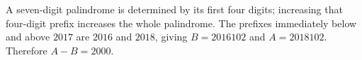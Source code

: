 A seven-digit palindrome is determined by its first four digits; increasing that four-digit prefix increases the whole palindrome. The prefixes immediately below and above $ 2017 $ are $ 2016 $ and $ 2018 $, giving $ B=2016102 $ and $ A=2018102 $. Therefore $\boxed{A-B=2000}$.
